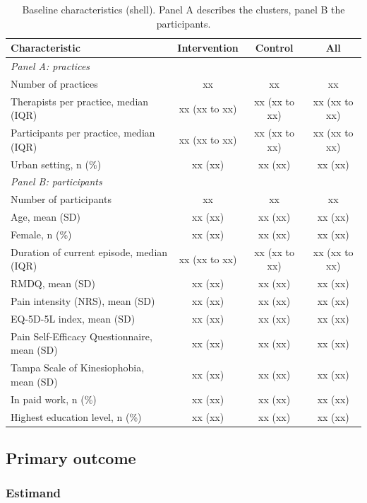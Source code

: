 \documentclass[11pt,a4paper]{article}
\begin{document}
\begin{table}[ht]
\centering\small
\caption{Baseline characteristics (shell). Panel A describes the clusters,
panel B the participants.}
\label{tab:base}
\begin{tabularx}{\textwidth}{Xccc}
\toprule
Characteristic & Intervention & Control & All\\
\midrule
\multicolumn{4}{l}{\emph{Panel A: practices}}\\
Number of practices & xx & xx & xx\\
Therapists per practice, median (IQR) & xx (xx to xx) & xx (xx to xx) & xx (xx to xx)\\
Participants per practice, median (IQR) & xx (xx to xx) & xx (xx to xx) & xx (xx to xx)\\
Urban setting, n (\%) & xx (xx) & xx (xx) & xx (xx)\\
\midrule
\multicolumn{4}{l}{\emph{Panel B: participants}}\\
Number of participants & xx & xx & xx\\
Age, mean (SD) & xx (xx) & xx (xx) & xx (xx)\\
Female, n (\%) & xx (xx) & xx (xx) & xx (xx)\\
Duration of current episode, median (IQR) & xx (xx to xx) & xx (xx to xx) & xx (xx to xx)\\
RMDQ, mean (SD) & xx (xx) & xx (xx) & xx (xx)\\
Pain intensity (NRS), mean (SD) & xx (xx) & xx (xx) & xx (xx)\\
EQ-5D-5L index, mean (SD) & xx (xx) & xx (xx) & xx (xx)\\
Pain Self-Efficacy Questionnaire, mean (SD) & xx (xx) & xx (xx) & xx (xx)\\
Tampa Scale of Kinesiophobia, mean (SD) & xx (xx) & xx (xx) & xx (xx)\\
In paid work, n (\%) & xx (xx) & xx (xx) & xx (xx)\\
Highest education level, n (\%) & xx (xx) & xx (xx) & xx (xx)\\
\bottomrule
\end{tabularx}
\end{table}

\subsection{Primary outcome}

\subsubsection{Estimand}
\end{document}
